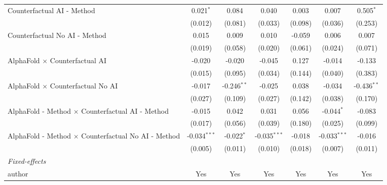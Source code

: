 \begin{tabular}{lcccccc}
   Counterfactual AI - Method                                 & 0.021$^{*}$    & 0.084         & 0.040          & 0.003   & 0.007          & 0.505$^{*}$\\   
                                                              & (0.012)        & (0.081)       & (0.033)        & (0.098) & (0.036)        & (0.253)\\   
   Counterfactual No AI - Method                              & 0.015          & 0.009         & 0.010          & -0.059  & 0.006          & 0.007\\   
                                                              & (0.019)        & (0.058)       & (0.020)        & (0.061) & (0.024)        & (0.071)\\   
   AlphaFold $\times$ Counterfactual AI                       & -0.020         & -0.020        & -0.045         & 0.127   & -0.014         & -0.133\\   
                                                              & (0.015)        & (0.095)       & (0.034)        & (0.144) & (0.040)        & (0.383)\\   
   AlphaFold $\times$ Counterfactual No AI                    & -0.017         & -0.246$^{**}$ & -0.025         & 0.038   & -0.034         & -0.436$^{**}$\\   
                                                              & (0.027)        & (0.109)       & (0.027)        & (0.142) & (0.038)        & (0.170)\\   
   AlphaFold - Method $\times$ Counterfactual AI - Method     & -0.015         & 0.042         & 0.031          & 0.056   & -0.044$^{*}$   & -0.083\\   
                                                              & (0.017)        & (0.056)       & (0.039)        & (0.180) & (0.025)        & (0.099)\\   
   AlphaFold - Method $\times$ Counterfactual No AI - Method  & -0.034$^{***}$ & -0.022$^{*}$  & -0.035$^{***}$ & -0.018  & -0.033$^{***}$ & -0.016\\   
                                                              & (0.005)        & (0.011)       & (0.010)        & (0.018) & (0.007)        & (0.011)\\   
   \midrule
   \emph{Fixed-effects}\\
   author                                                     & Yes            & Yes           & Yes            & Yes     & Yes            & Yes\\  

\end{tabular}
